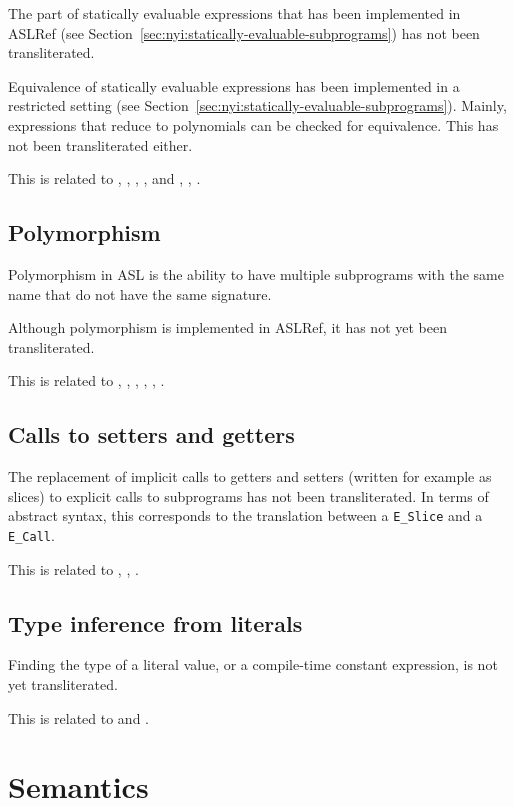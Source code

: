 \documentclass{book}
\begin{document}
The part of statically evaluable expressions that has been implemented in
ASLRef (see Section~\ref{sec:nyi:statically-evaluable-subprograms}) has not
been transliterated.

Equivalence of statically evaluable expressions has been implemented in a
restricted setting (see
Section~\ref{sec:nyi:statically-evaluable-subprograms}).
%
Mainly, expressions that reduce to polynomials can be checked for equivalence.
%
This has not been transliterated either.

This is related to , , , ,
and , , .

\subsection{Polymorphism}

Polymorphism in ASL is the ability to have multiple subprograms with the same
name that do not have the same signature.

Although polymorphism is implemented in ASLRef, it has not yet been
transliterated.

This is related to , , , ,
, .

\subsection{Calls to setters and getters}

The replacement of implicit calls to getters and setters (written for example as
slices) to explicit calls to subprograms has not been transliterated.
%
In terms of abstract syntax, this corresponds to the translation between a
\texttt{E\_Slice} and a \texttt{E\_Call}.

This is related to , , .

\subsection{Type inference from literals}

Finding the type of a literal value, or a compile-time constant expression, is
not yet transliterated.

This is related to  and .

\section{Semantics}
\end{document}
